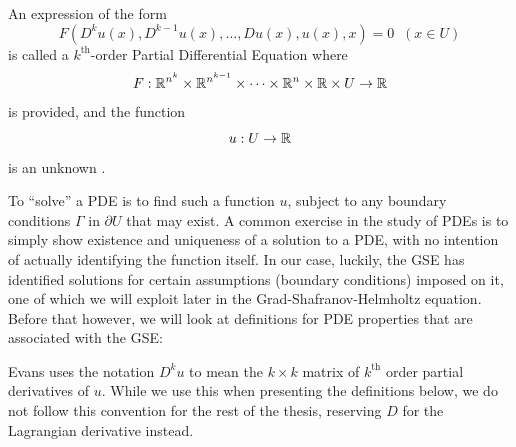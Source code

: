 \begin{definition}
    An expression of the form
    \begin{equation}
        \label{pde-definition}
        F(D^k u(x), D^{k-1} u(x), \dots, Du(x), u(x), x) = 0 \;\; (x \in U)
    \end{equation}
    is called a $k^{\text{th}}$-order Partial Differential Equation where 
    $$F : \mathbb{R}^{n^k} \times \mathbb{R}^{n^{k-1}} \times \dots \times \mathbb{R}^n \times \mathbb{R} \times U \to \mathbb{R}$$
    is provided, and the function
    $$u: U \to \mathbb{R}$$
    is an unknown \cite{evans-pdes}.
\end{definition}

To ``solve'' a PDE is to find such a function $u$, subject to any boundary conditions $\Gamma$ in $\partial U$ that may exist. A 
common exercise in the study of PDEs is to simply show existence and uniqueness of a solution to a PDE, with no 
intention of actually identifying the function itself. In our case, luckily, the GSE has identified solutions for 
certain assumptions (boundary conditions) imposed on it, one of which we will exploit later in the Grad-Shafranov-Helmholtz 
equation. Before that however, we will look at definitions for PDE properties that are associated with the GSE:

\begin{notn}
    Evans uses the notation $D^{k} u$ to mean the $k \times k$ matrix of $k^{\text{th}}$ order partial derivatives of $u$.
    While we use this when presenting the definitions below, we do not follow this convention for the rest of the thesis,
    reserving $D$ for the Lagrangian derivative instead.
\end{notn}

